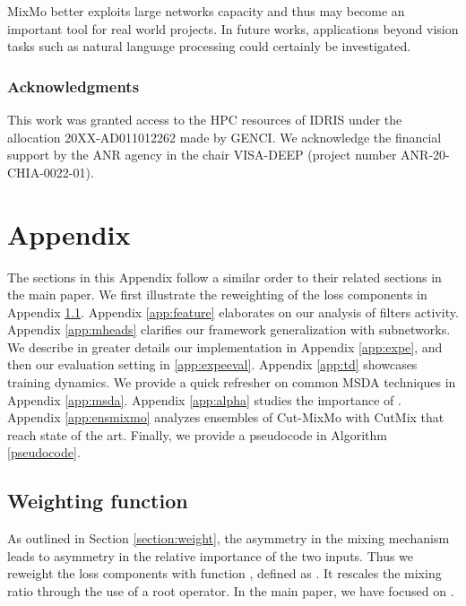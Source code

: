 \documentclass[10pt,twocolumn,letterpaper]{article}
\begin{document}
MixMo better exploits large networks capacity and thus may become an important tool for real world projects. In future works, applications beyond vision tasks such as natural language processing could certainly be investigated.






 \clearpage
\subsubsection*{Acknowledgments}
This work was granted access to the HPC resources of IDRIS under the allocation 20XX-AD011012262 made by GENCI. We acknowledge the financial support by the ANR agency in the chair VISA-DEEP (project number ANR-20-CHIA-0022-01).
{\small


}

 
\clearpage


\section{Appendix}

The sections in this Appendix follow a similar order to their related sections in the main paper. 
We first illustrate the reweighting of the loss components in Appendix \ref{app:weighting}.
Appendix \ref{app:feature} elaborates on our analysis of filters activity.
Appendix \ref{app:mheads} clarifies our framework generalization with  subnetworks.
We describe in greater details our implementation in Appendix \ref{app:expe}, and then our evaluation setting in \ref{app:expeeval}.
Appendix \ref{app:td} showcases training dynamics.
We provide a quick refresher on common MSDA techniques in Appendix \ref{app:msda}.
Appendix \ref{app:alpha} studies the importance of .
Appendix \ref{app:ensmixmo} analyzes ensembles of Cut-MixMo with CutMix that reach state of the art. 
Finally, we provide a pseudocode in Algorithm \ref{pseudocode}.

\subsection{Weighting function }
\label{app:weighting}
As outlined in Section \ref{section:weight}, the asymmetry in the mixing mechanism leads to
asymmetry in the relative importance of the two inputs.
Thus we reweight the loss components with function , defined as
. It
rescales the mixing ratio   through the use of a  root
operator. In the main paper, we have focused on .
\end{document}
